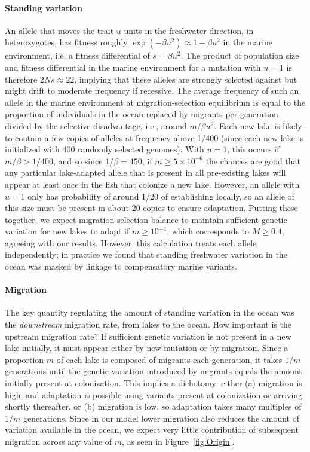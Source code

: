 \documentclass{article}
\begin{document}
\paragraph{Standing variation}
An allele that moves the trait $u$ units in the freshwater direction, in heterozygotes, has fitness roughly $\exp(-\beta u^2) \approx 1 - \beta u^2$ in the marine environment, i.e, a fitness differential of $s = \beta u^2$. The product of population size and fitness differential in the marine environment for a mutation with $u=1$ is therefore $2Ns \approx 22$, implying that these alleles are strongly selected against but might drift to moderate frequency if recessive. The average frequency of such an allele in the marine environment at migration-selection equilibrium is equal to the proportion of individuals in the ocean replaced by migrants per generation divided by the selective disadvantage, i.e., around $m / \beta u^2$. 
Each new lake is likely to contain a few copies of alleles at frequency above 1/400 (since each new lake is initialized with 400 randomly selected genomes). With $u=1$, this occurs if $m/\beta > 1/400$,
and so since $1/\beta = 450$, if $m \ge 5 \times 10^{-6}$ the chances are good that any particular lake-adapted allele that is present in all pre-existing lakes will appear at least once in the fish that colonize a new lake. However, an allele with $u=1$ only has probability of around 1/20 of establishing locally, so an allele of this size must be present in about 20 copies to ensure adaptation. Putting these together, we expect migration-selection balance to maintain sufficient genetic variation for new lakes to adapt if $m \ge 10^{-4}$, which corresponds to $M \ge 0.4$,
agreeing with our results.
However, this calculation treats each allele independently; in practice we found that standing freshwater variation in the ocean was masked by linkage to compensatory marine variants.

\paragraph{Migration}
The key quantity regulating the amount of standing variation in the ocean was the \emph{downstream} migration rate, from lakes to the ocean. How important is the upstream migration rate?
If sufficient genetic variation is not present in a new lake initially, it must appear either by new mutation or by migration. Since a proportion $m$ of each lake is composed of migrants each generation, 
it takes $1/m$ generations until the genetic variation introduced by migrants equals the amount initially present at colonization. This implies a dichotomy: either (a) migration is high, and adaptation is possible using variants present at colonization or arriving shortly thereafter, or (b) migration is low, so adaptation takes many multiples of $1/m$ generations. Since in our model lower migration also reduces the amount of variation available in the ocean, we expect very little contribution of subsequent migration across any value of $m$, as seen in Figure~\ref{fig:Origin}.
\end{document}
